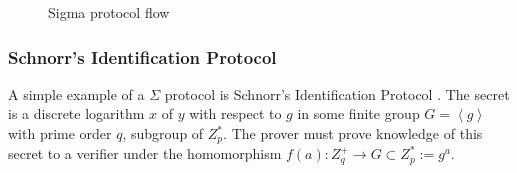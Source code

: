\begin{figure}[hb!]
  \centering
  \caption{Sigma protocol flow}
  \label{fig:sigma_flow}
\end{figure}

\subsubsection{Schnorr's Identification Protocol}
\label{subsubsec:schnorr_protocol}

A simple example of a $\Sigma$ protocol is Schnorr's Identification
Protocol \cite{schnorr_protocol, cryptography_introduction}. The
secret is a discrete logarithm $x$ of $y$ with respect to $g$ in some
finite group $G = \left< g \right>$ with prime order $q$, subgroup of
$Z_p^*$. The prover must prove knowledge of this secret to a verifier under
the homomorphism $f(a) : Z_q^+ \rightarrow G \subset Z_p^* := g^a$.

